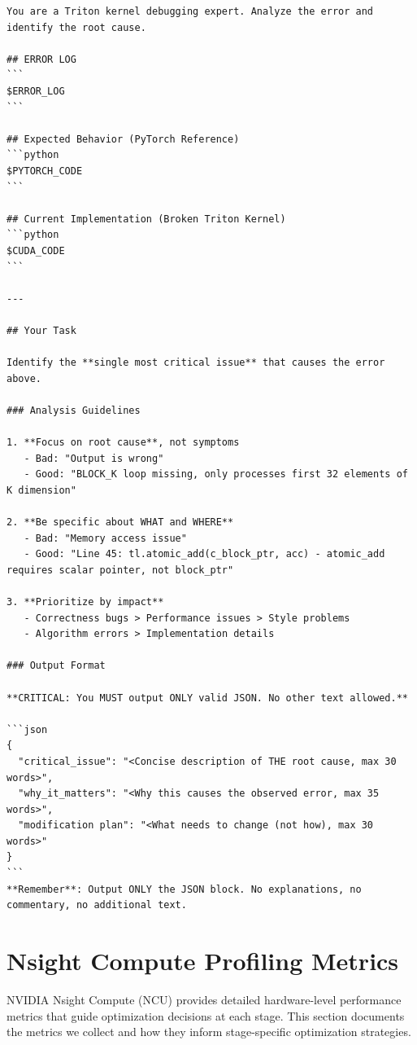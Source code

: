 \begin{mdframed}[linewidth=1pt, linecolor=black, backgroundcolor=gray!5]
\begin{lstlisting}
You are a Triton kernel debugging expert. Analyze the error and identify the root cause.

## ERROR LOG
```
$ERROR_LOG
```

## Expected Behavior (PyTorch Reference)
```python
$PYTORCH_CODE
```

## Current Implementation (Broken Triton Kernel)
```python
$CUDA_CODE
```

---

## Your Task

Identify the **single most critical issue** that causes the error above.

### Analysis Guidelines

1. **Focus on root cause**, not symptoms
   - Bad: "Output is wrong"
   - Good: "BLOCK_K loop missing, only processes first 32 elements of K dimension"

2. **Be specific about WHAT and WHERE**
   - Bad: "Memory access issue"
   - Good: "Line 45: tl.atomic_add(c_block_ptr, acc) - atomic_add requires scalar pointer, not block_ptr"

3. **Prioritize by impact**
   - Correctness bugs > Performance issues > Style problems
   - Algorithm errors > Implementation details

### Output Format

**CRITICAL: You MUST output ONLY valid JSON. No other text allowed.**

```json
{
  "critical_issue": "<Concise description of THE root cause, max 30 words>",
  "why_it_matters": "<Why this causes the observed error, max 35 words>",
  "modification plan": "<What needs to change (not how), max 30 words>"
}
```
**Remember**: Output ONLY the JSON block. No explanations, no commentary, no additional text.
\end{lstlisting}
\end{mdframed}

\section{Nsight Compute Profiling Metrics}

NVIDIA Nsight Compute (NCU) provides detailed hardware-level performance metrics that guide optimization decisions at each stage. This section documents the metrics we collect and how they inform stage-specific optimization strategies.

